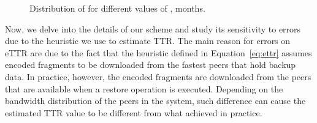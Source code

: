  \begin{figure}[ht!]
  \centering
 \caption{Distribution of  for different values of ,  months.}
 \label{fig:ttr}
\end{figure}
 
Now, we delve into the details of our scheme and study its sensitivity
to errors due to the heuristic we use to estimate TTR. The main
reason for errors on eTTR are due to the fact that the heuristic
defined in Equation~\ref{eq:ettr} assumes  encoded fragments to be
downloaded from the  fastest peers that hold backup data. In
practice, however, the  encoded fragments are downloaded from the
peers that are available when a restore operation is
executed. Depending on the bandwidth distribution of the peers in the
system, such difference can cause the estimated TTR value to be
different from what achieved in practice.


